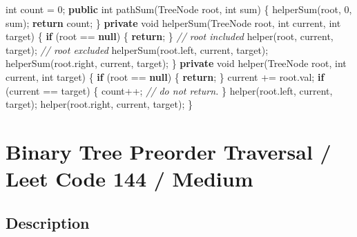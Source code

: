 \documentclass[]{book}
\newenvironment{Shaded}{\begin{snugshade}}{\end{snugshade}}
\newcommand{\BuiltInTok}[1]{#1}
\newcommand{\CommentTok}[1]{\textcolor[rgb]{0.56,0.35,0.01}{\textit{#1}}}
\newcommand{\DataTypeTok}[1]{\textcolor[rgb]{0.13,0.29,0.53}{#1}}
\newcommand{\DecValTok}[1]{\textcolor[rgb]{0.00,0.00,0.81}{#1}}
\newcommand{\FunctionTok}[1]{\textcolor[rgb]{0.00,0.00,0.00}{#1}}
\newcommand{\KeywordTok}[1]{\textcolor[rgb]{0.13,0.29,0.53}{\textbf{#1}}}
\newcommand{\NormalTok}[1]{#1}
\begin{document}
\begin{Shaded}
\begin{Highlighting}[]
\DataTypeTok{int}\NormalTok{ count = }\DecValTok{0}\NormalTok{;}
\KeywordTok{public} \DataTypeTok{int} \FunctionTok{pathSum}\NormalTok{(}\BuiltInTok{TreeNode}\NormalTok{ root, }\DataTypeTok{int}\NormalTok{ sum) \{}
    \FunctionTok{helperSum}\NormalTok{(root, }\DecValTok{0}\NormalTok{, sum);}
    \KeywordTok{return}\NormalTok{ count;}
\NormalTok{\}}
\KeywordTok{private} \DataTypeTok{void} \FunctionTok{helperSum}\NormalTok{(}\BuiltInTok{TreeNode}\NormalTok{ root, }\DataTypeTok{int}\NormalTok{ current, }\DataTypeTok{int}\NormalTok{ target) \{}
    \KeywordTok{if}\NormalTok{ (root == }\KeywordTok{null}\NormalTok{) \{}
        \KeywordTok{return}\NormalTok{;}
\NormalTok{    \}}
    \CommentTok{// root included}
    \FunctionTok{helper}\NormalTok{(root, current, target);}
    \CommentTok{// root excluded}
    \FunctionTok{helperSum}\NormalTok{(root.}\FunctionTok{left}\NormalTok{, current, target);}
    \FunctionTok{helperSum}\NormalTok{(root.}\FunctionTok{right}\NormalTok{, current, target);}
\NormalTok{\}}
\KeywordTok{private} \DataTypeTok{void} \FunctionTok{helper}\NormalTok{(}\BuiltInTok{TreeNode}\NormalTok{ root, }\DataTypeTok{int}\NormalTok{ current, }\DataTypeTok{int}\NormalTok{ target) \{}
    \KeywordTok{if}\NormalTok{ (root == }\KeywordTok{null}\NormalTok{) \{}
        \KeywordTok{return}\NormalTok{;}
\NormalTok{    \}}
\NormalTok{    current += root.}\FunctionTok{val}\NormalTok{;}
    \KeywordTok{if}\NormalTok{ (current == target) \{}
\NormalTok{        count++;}
        \CommentTok{// do not return.}
\NormalTok{    \}}
    \FunctionTok{helper}\NormalTok{(root.}\FunctionTok{left}\NormalTok{, current, target);}
    \FunctionTok{helper}\NormalTok{(root.}\FunctionTok{right}\NormalTok{, current, target);}
\NormalTok{\}}
\end{Highlighting}
\end{Shaded}

\hypertarget{binary-tree-preorder-traversal-leet-code-144-medium}{%
\section{Binary Tree Preorder Traversal / Leet Code 144 / Medium}\label{binary-tree-preorder-traversal-leet-code-144-medium}}

\label{sec:depth_first_preorder}

\hypertarget{description-62}{%
\subsection{Description}\label{description-62}}
\end{document}

